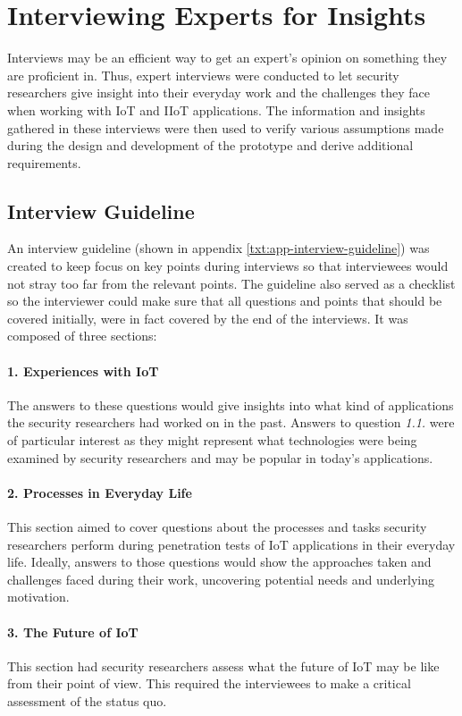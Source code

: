 \section{Interviewing Experts for Insights}
\label{sec:interviews}
Interviews may be an efficient way to get an expert’s opinion on something they are proficient in. Thus, expert interviews were conducted to let security researchers give insight into their everyday work and the challenges they face when working with \ac{IoT} and \ac{IIoT} applications. The information and insights gathered in these interviews were then used to verify various assumptions made during the design and development of the prototype and derive additional requirements.

\subsection{Interview Guideline}
An interview guideline (shown in appendix \ref{txt:app-interview-guideline}) was created to keep focus on key points during interviews so that interviewees would not stray too far from the relevant points. The guideline also served as a checklist so the interviewer could make sure that all questions and points that should be covered  initially, were in fact covered by the end of the interviews. It was composed of three sections:

\paragraph{1. Experiences with IoT} The answers to these questions would give insights into what kind of applications the security researchers had worked on in the past. Answers to question \emph{1.1.} were of particular interest as they might represent what technologies were being examined by security researchers and may be popular in today’s applications.
\paragraph{2. Processes in Everyday Life} This section aimed to cover questions about the processes and tasks security researchers perform during penetration tests of IoT applications in their everyday life. Ideally, answers to those questions would show the approaches taken and challenges faced during their work, uncovering potential needs and underlying motivation.
\paragraph{3. The Future of IoT} This section had security researchers assess what the future of IoT may be like from their point of view. This required the interviewees to make a critical assessment of the status quo.


